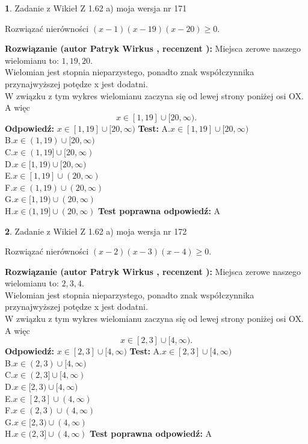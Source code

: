 \documentclass[12pt, a4paper]{article}
\theoremstyle{definition} %
\newtheorem{zad}{}
\newcommand{\zadStart}[1]{\begin{zad}#1\newline}
\newcommand{\zadStop}{\end{zad}}
\newcommand{\rozwStart}[2]{\noindent \textbf{Rozwiązanie (autor #1 , recenzent #2): }\newline}
\newcommand{\rozwStop}{\newline}
\newcommand{\odpStart}{\noindent \textbf{Odpowiedź:}\newline}
\newcommand{\odpStop}{\newline}
\newcommand{\testStart}{\noindent \textbf{Test:}\newline}
\newcommand{\testStop}{\newline}
\newcommand{\kluczStart}{\noindent \textbf{Test poprawna odpowiedź:}\newline}
\newcommand{\kluczStop}{\newline}
\begin{document}
\zadStart{Zadanie z Wikieł Z 1.62 a) moja wersja nr 171}

Rozwiązać nierówności $(x-1)(x-19)(x-20)\ge0$.
\zadStop
\rozwStart{Patryk Wirkus}{}
Miejsca zerowe naszego wielomianu to: $1, 19, 20$.\\
Wielomian jest stopnia nieparzystego, ponadto znak współczynnika przy\linebreak najwyższej potędze x jest dodatni.\\ W związku z tym wykres wielomianu zaczyna się od lewej strony poniżej osi OX. A więc $$x \in [1,19] \cup [20,\infty).$$
\rozwStop
\odpStart
$x \in [1,19] \cup [20,\infty)$
\odpStop
\testStart
A.$x \in [1,19] \cup [20,\infty)$\\
B.$x \in (1,19) \cup [20,\infty)$\\
C.$x \in (1,19] \cup [20,\infty)$\\
D.$x \in [1,19) \cup [20,\infty)$\\
E.$x \in [1,19] \cup (20,\infty)$\\
F.$x \in (1,19) \cup (20,\infty)$\\
G.$x \in [1,19) \cup (20,\infty)$\\
H.$x \in (1,19] \cup (20,\infty)$
\testStop
\kluczStart
A
\kluczStop



\zadStart{Zadanie z Wikieł Z 1.62 a) moja wersja nr 172}

Rozwiązać nierówności $(x-2)(x-3)(x-4)\ge0$.
\zadStop
\rozwStart{Patryk Wirkus}{}
Miejsca zerowe naszego wielomianu to: $2, 3, 4$.\\
Wielomian jest stopnia nieparzystego, ponadto znak współczynnika przy\linebreak najwyższej potędze x jest dodatni.\\ W związku z tym wykres wielomianu zaczyna się od lewej strony poniżej osi OX. A więc $$x \in [2,3] \cup [4,\infty).$$
\rozwStop
\odpStart
$x \in [2,3] \cup [4,\infty)$
\odpStop
\testStart
A.$x \in [2,3] \cup [4,\infty)$\\
B.$x \in (2,3) \cup [4,\infty)$\\
C.$x \in (2,3] \cup [4,\infty)$\\
D.$x \in [2,3) \cup [4,\infty)$\\
E.$x \in [2,3] \cup (4,\infty)$\\
F.$x \in (2,3) \cup (4,\infty)$\\
G.$x \in [2,3) \cup (4,\infty)$\\
H.$x \in (2,3] \cup (4,\infty)$
\testStop
\kluczStart
A
\kluczStop
\end{document}
